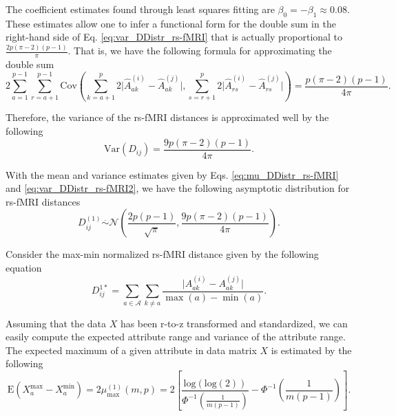\documentclass[10pt,letterpaper]{article}\usepackage[]{graphicx}\usepackage[]{color}
\begin{document}
The coefficient estimates found through least squares fitting are $\beta_0 = - \beta_1 \approx 0.08$. These estimates allow one to infer a functional form for the double sum in the right-hand side of Eq. \ref{eq:var_DDistr_rs-fMRI} that is actually proportional to $\frac{2p(\pi-2)(p-1)}{\pi}$. That is, we have the following formula for approximating the double sum
%
\begin{equation}\label{eq:estimate_cov_form}
2\sum_{a = 1}^{p-1} \sum_{r=a+1}^{p-1} \text{Cov}\left(\sum_{k=a+1}^{p} 2\bigl|\hat{A}^{(i)}_{ak} - \hat{A}^{(j)}_{ak}\bigr|, \sum_{s=r+1}^{p} 2\bigl|\hat{A}^{(i)}_{rs} - \hat{A}^{(j)}_{rs}\bigr|\right) = \frac{p(\pi - 2)(p - 1)}{4\pi}.
\end{equation}

Therefore, the variance of the rs-fMRI distances is approximated well by the following
%
\begin{equation}\label{eq:var_DDistr_rs-fMRI2}
\text{Var}(D_{ij}) = \frac{9p(\pi - 2)(p-1)}{4\pi}.
\end{equation}

With the mean and variance estimates given by Eqs. \ref{eq:mu_DDistr_rs-fMRI} and \ref{eq:var_DDistr_rs-fMRI2}, we have the following asymptotic distribution for rs-fMRI distances
%
\begin{equation}\label{eq:DDistr_rs-fMRI}
D^{(1)}_{ij} \overset{.}{\sim} \mathcal{N}\left(\frac{2p(p-1)}{\sqrt{\pi}}, \frac{9p(\pi - 2)(p-1)}{4\pi}\right).
\end{equation}

Consider the max-min normalized rs-fMRI distance given by the following equation
%
\begin{equation}\label{eq:max-min_diff_rs-fMRI}
D^{1*}_{ij} = \sum_{a \in \mathcal{A}} \sum_{k \neq a} \frac{\bigl|A^{(i)}_{ak} - A^{(j)}_{ak}\bigr|}{\max(a) - \min(a)}.
\end{equation}

Assuming that the data $X$ has been r-to-z transformed and standardized, we can easily compute the expected attribute range and variance of the attribute range. The expected maximum of a given attribute in data matrix $X$ is estimated by the following
%
\begin{equation}\label{eq:mean_max_rs-fMRI}
\text{E}\left(X^\text{max}_a - X^\text{min}_a\right) = 2\mu^{(1)}_\text{max}(m,p) = 2 \left[\frac{\text{log}(\text{log}(2))}{\Phi^{-1}\left(\frac{1}{m(p-1)}\right)} - \Phi^{-1}\left(\frac{1}{m(p-1)}\right)\right].
\end{equation}
\end{document}
